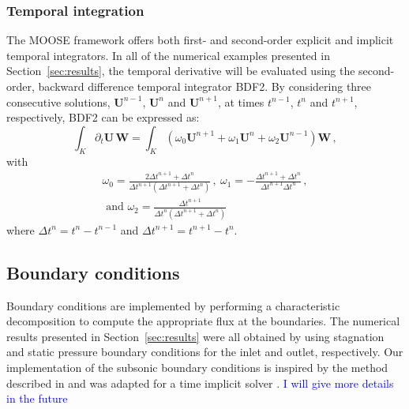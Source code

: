 \documentclass[preprint,10pt]{elsarticle}
\newcommand{\sct}[1]{Section~\ref{#1}}                   %
\newcommand{\tcr}[1]{\textcolor{red}{#1}}
\newcommand{\tcb}[1]{\textcolor{blue}{#1}}
\begin{document}
\subsubsection{Temporal integration} 
The MOOSE framework offers both first- and second-order explicit and implicit temporal integrators. 
In all of the numerical examples presented in \sct{sec:results}, the temporal derivative  will be 
evaluated using the second-order, backward difference temporal integrator BDF2. By considering three 
consecutive solutions, $\mathbf U^{n-1}$, $\mathbf U^n$ and $\mathbf U^{n+1}$, at times $t^{n-1}$, $t^n$ and $t^{n+1}$, respectively, BDF2 can be expressed as:
\begin{equation}
\label{eq:BDF2}
\int_{K} \partial_t \mathbf U \, \mathbf  W = \int_{K} \left( \omega_0 \mathbf U^{n+1}  + \omega_1 \mathbf U^n + \omega_2 \mathbf U^{n-1} \right) \mathbf W \,,
\end{equation}
%
with
\begin{multline}
\omega_0 =\frac{2\Delta t^{n+1}+\Delta t^n}{\Delta t^{n+1} \left( \Delta t^{n+1}+\Delta t^n \right)} \, , \ 
\omega_1 = -\frac{\Delta t^{n+1}+\Delta t^n}{\Delta t^{n+1} \Delta t^n}  \, , \\
\text{ and } \omega_2 = \frac{\Delta t^{n+1}}{\Delta t^n \left( \Delta t^{n+1} + \Delta t^n \right)} \nonumber
\end{multline}
where $\Delta t^{n} = t^n-t^{n-1}$ and $\Delta t^{n+1} = t^{n+1}-t^{n}$.
\subsection{Boundary conditions} \label{sec:bc}
Boundary conditions are implemented by performing a characteristic decomposition to compute the 
appropriate flux at the boundaries. The numerical results presented in \sct{sec:results} were all obtained by using stagnation and static pressure boundary conditions for the inlet and outlet, respectively.
Our implementation of the subsonic boundary conditions is inspired by the method described in \cite{SEM} 
and was adapted for a time implicit solver \cite{Marco_dissertation}. 
\tcb{I will give more details in the future}
\end{document}
